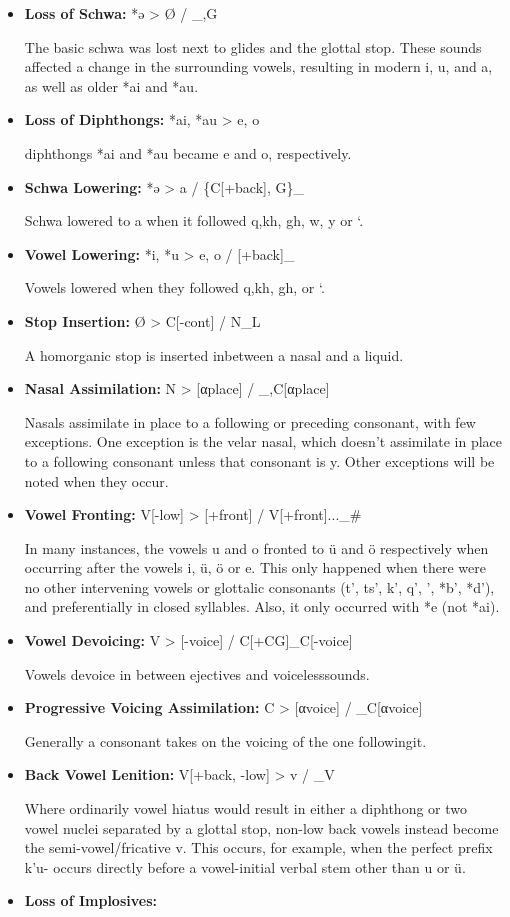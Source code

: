 \begin{itemize}
\item
\textbf{Loss of Schwa:}
*ǝ > Ø / \_,G

The basic schwa was lost next to glides and the glottal stop.
These sounds affected a change in the surrounding vowels, resulting in modern i, u, and a, as well as older *ai and *au.
\item
\textbf{Loss of Diphthongs:}
*ai, *au > e, o

diphthongs *ai and *au became e and o, respectively.
\item
\textbf{Schwa Lowering:}
*ǝ > a / \{C[+back], G\}\_

Schwa lowered to a when it followed q,kh, gh, w, y or ‘.
\item
\textbf{Vowel Lowering:}
*i, *u > e, o / [+back]\_

Vowels lowered when they followed q,kh, gh, or ‘.
\item
\textbf{Stop Insertion:}
Ø > C[-cont] / N\_L

A homorganic stop is inserted inbetween a nasal and a liquid.
\item
\textbf{Nasal Assimilation:}
N > [αplace] / \_,C[αplace]

Nasals assimilate in place to a following or preceding consonant, with few exceptions.
One exception is the velar nasal, which doesn't assimilate in place to a following consonant unless that consonant is y.
Other exceptions will be noted when they occur.
\item
\textbf{Vowel Fronting:}
V[-low] > [+front] / V[+front]...\_\#

In many instances, the vowels u and o fronted to ü and ö respectively when occurring after the vowels i, ü, ö or e.
This only happened when there were no other intervening vowels or glottalic consonants (t', ts', k', q', ', *b', *d'), and preferentially in closed syllables.
Also, it only occurred with *e (not *ai).
\item
\textbf{Vowel Devoicing:}
V > [-voice] / C[+CG]\_C[-voice]

Vowels devoice in between ejectives and voicelesssounds.
\item
\textbf{Progressive Voicing Assimilation:}
C > [αvoice] / \_C[αvoice]

Generally a consonant takes on the voicing of the one followingit.
\item
\textbf{Back Vowel Lenition:}
V[+back, -low] > v / \_V

Where ordinarily vowel hiatus would result in either a diphthong or two vowel nuclei separated by a glottal stop, non-low back vowels instead become the semi-vowel/fricative v.
This occurs, for example, when the perfect prefix k'u- occurs directly before a vowel-initial verbal stem other than u or ü.
\item
\textbf{Loss of Implosives:}


\end{itemize}
